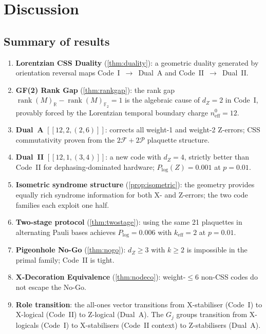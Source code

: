 \documentclass[12pt,a4paper]{article}
\theoremstyle{plain}
\theoremstyle{definition}
\theoremstyle{remark}
\newcommand{\GFtwo}{\mathbb{F}_2}
\newcommand{\R}{\mathbb{R}}
\newcommand{\rank}{\operatorname{rank}}
\newcommand{\FS}{\mathcal{F}}
\newcommand{\PS}{\mathcal{P}}
\begin{document}
\section{Discussion}\label{sec:discussion}

\subsection{Summary of results}

\begin{enumerate}[label=(\roman*),noitemsep]
\item \textbf{Lorentzian CSS Duality} (\cref{thm:duality}): a geometric
  duality generated by orientation reversal maps
  Code~I~$\to$~Dual~A and Code~II~$\to$~Dual~II.
\item \textbf{GF(2) Rank Gap} (\cref{thm:rankgap}): the rank gap
  $\rank(M)_\R - \rank(M)_{\GFtwo} = 1$ is the algebraic cause of
  $d_Z = 2$ in Code~I, provably forced by the Lorentzian temporal
  boundary charge $n_{\mathrm{eff}}^0 = 12$.
\item \textbf{Dual~A} $[[12,2,(2,6)]]$: corrects all weight-1 and
  weight-2 Z-errors; CSS commutativity proven from the $2\FS+2\PS$
  plaquette structure.
\item \textbf{Dual~II} $[[12,1,(3,4)]]$: a new code with $d_Z = 4$,
  strictly better than Code~II for dephasing-dominated hardware;
  $P_{\log}(Z) = 0.001$ at $p = 0.01$.
\item \textbf{Isometric syndrome structure} (\cref{prop:isometric}):
  the geometry provides equally rich syndrome information for both
  X- and Z-errors; the two code families each exploit one half.
\item \textbf{Two-stage protocol} (\cref{thm:twostage}): using the same
  21 plaquettes in alternating Pauli bases achieves $P_{\log}=0.006$
  with $k_{\mathrm{eff}}=2$ at $p=0.01$.
\item \textbf{Pigeonhole No-Go} (\cref{thm:nogo}): $d_Z\geq3$ with
  $k\geq2$ is impossible in the primal family; Code~II is tight.
\item \textbf{X-Decoration Equivalence} (\cref{thm:nodeco}):
  weight-$\leq6$ non-CSS codes do not escape the No-Go.
\item \textbf{Role transition}: the all-ones vector transitions from
  X-stabiliser (Code~I) to X-logical (Code~II) to Z-logical (Dual~A).
  The $G_j$ groups transition from X-logicals (Code~I) to
  X-stabilisers (Code~II context) to Z-stabilisers (Dual~A).
\end{enumerate}
\end{document}
